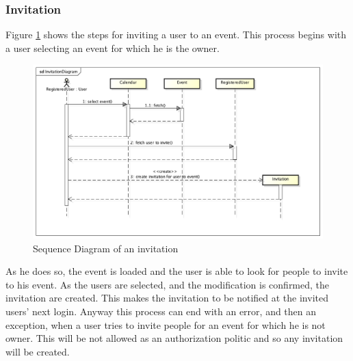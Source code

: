 \subsubsection{Invitation}
Figure \ref{fig:invitseqdiag} shows the steps for inviting a user to an event. This process begins with a user selecting an event for which he is the owner.
\begin{center}
 \begin{figure}[H]
    \includegraphics[width=1\textwidth,height=1\textwidth]{../UMLDiagram/sequence/InvitationDiagram/InvitationDiagram.png}
    \caption{Sequence Diagram of an invitation}
     \label{fig:invitseqdiag}
     \end{figure}
   \end{center}
As he does so, the event is loaded and the user is able to look for people to invite to his event. As the users are selected, and the modification is confirmed, the invitation are created. This makes the invitation to be notified at the invited users' next login. Anyway this process can end with an error, and then an exception, when a user tries to invite people for an event for which he is not owner. This will be not allowed as an authorization politic and so any invitation will be created.
\newpage
